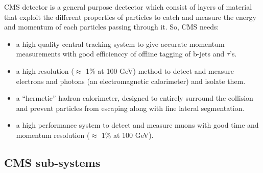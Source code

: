 CMS\cite{paper:JINST:CMSCollaboration} detector is a general purpose deetector which consist of layers of material that exploit the different properties of particles to catch and measure the energy and momentum of each particles passing through it. So, CMS needs:
\begin{itemize}
	\item a high quality central tracking system to give accurate momentum measurements with good efficienccy of offline tagging of b-jets and $\tau$'s.
	\item a high resolution ($\approx$ 1\% at 100 GeV) method to detect and measure electrons and photons (an electromagnetic calorimeter) and isolate them.
	\item a ``hermetic” hadron calorimeter, designed to entirely surround the collision and prevent particles from escaping along with fine lateral segmentation.
	\item a high performance system to detect and measure muons with good time and momentum resolution ($\approx$ 1\% at 100 GeV).
\end{itemize}



\subsection{CMS sub-systems} %
\label{sub:cms_sub_systems}

